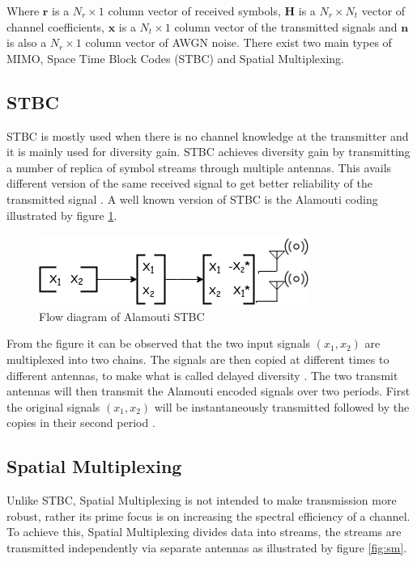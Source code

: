 \documentclass[11pt]{report}
\renewcommand{\vec}[1]{\mathbf{#1}} %
\begin{document}
Where $ \vec{r} $ is a $ N_r\times1 $ column vector of received symbols, $ \vec{H} $ is a $ N_r\times N_t $ vector of channel coefficients, $ \vec{x} $ is a $N_t\times1 $ column vector of the transmitted signals and $\vec{n}$ is also a $ N_r\times1 $ column vector of AWGN noise. There exist two main types of MIMO, Space Time Block Codes (STBC) and Spatial Multiplexing.

\subsection{STBC}
\label{sub:stbc}
STBC is mostly used when there is no channel knowledge at the transmitter and it is mainly used for diversity gain. STBC achieves diversity gain by transmitting a number of replica of symbol streams through multiple antennas. This avails different version of the same received signal to get better reliability of the transmitted signal \cite{14}. A well known version of STBC is the Alamouti coding illustrated by figure \ref{fig:al}.

\begin{figure}[h!]
	\centering
	\includegraphics[scale=0.65]{resources/al.png}
	\caption{Flow diagram of Alamouti STBC}
	\label{fig:al}
\end{figure} 
From the figure it can be observed that the two input signals $(x_1, x_2)$ are multiplexed into two chains. The signals are then copied at different times to different antennas, to make what is called delayed diversity \cite{B8}. The two transmit antennas will then transmit the Alamouti encoded signals over two periods. First the original signals $(x_1,x_2)$ will be instantaneously transmitted followed by the copies in their second period \cite{14}. 

\subsection{Spatial Multiplexing} 
Unlike STBC, Spatial Multiplexing is not intended to make transmission more robust, rather its prime focus is on increasing the spectral efficiency of a channel. To achieve this, Spatial Multiplexing divides data into streams, the streams are transmitted independently via separate antennas as illustrated by figure \ref{fig:sm}.
\end{document}
